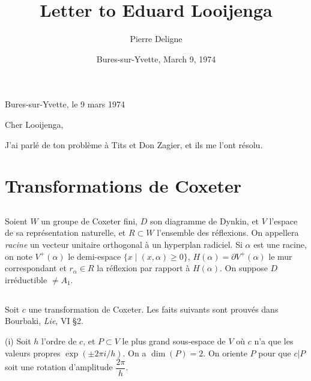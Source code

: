 \documentclass[11pt,a4paper]{article}
\title{Letter to Eduard Looijenga}
\author{Pierre Deligne}
\date{Bures-sur-Yvette, March 9, 1974}
\theoremstyle{plain}
\theoremstyle{definition}
\begin{document}
\maketitle

\thispagestyle{empty}

\vspace{-0.5cm}

\noindent
Bures-sur-Yvette, le 9 mars 1974

\vspace{0.5cm}

\noindent
Cher Looijenga,

\vspace{0.3cm}

J'ai parl\'e de ton probl\`eme \`a Tits et Don Zagier, et ils me l'ont r\'esolu.

\section{Transformations de Coxeter}

\subsection{}

Soient $W$ un groupe de Coxeter fini, $D$ son diagramme de Dynkin, et $V$ l'espace de sa repr\'esentation naturelle, et $R \subset W$ l'ensemble des r\'eflexions. On appellera \emph{racine} un vecteur unitaire orthogonal \`a un hyperplan radiciel. Si $\alpha$ est une racine, on note $V^{+}(\alpha)$ le demi-espace $\{x \mid (x,\alpha) \geq 0\}$, $H(\alpha) = \partial V^{+}(\alpha)$ le mur correspondant et $r_{\alpha} \in R$ la r\'eflexion par rapport \`a $H(\alpha)$. On suppose $D$ irr\'eductible $\neq A_1$.

\subsection{}

Soit $c$ une transformation de Coxeter. Les faits suivants sont prouv\'es dans Bourbaki, \textit{Lie}, VI \S 2.

\smallskip

\noindent
\textup{(i)} Soit $h$ l'ordre de $c$, et $P \subset V$ le plus grand sous-espace de $V$ o\`u $c$ n'a que les valeurs propres $\exp(\pm 2\pi i/h)$. On a $\dim(P) = 2$. On oriente $P$ pour que $c|P$ soit une rotation d'amplitude $\dfrac{2\pi}{h}$.

\smallskip
\end{document}
